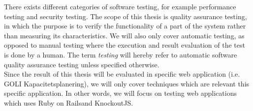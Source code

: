There exists different categories of software testing, for example
performance testing and security testing. The scope of this thesis is
quality assurance testing\footnotemark, in which the purpose is to
verify the functionality of a part of the system rather than measuring
its characteristics. We will also only cover automatic testing, as
opposed to manual testing where the execution and result evaluation of
the test is done by a human. The term \emph{testing} will hereby refer
to automatic software quality assurance testing unless specified
otherwise.\\

Since the result of this thesis will be evaluated in specific web
application (i.e. GOLI Kapacitetsplanering), we will only cover
techniques which are relevant this specific application. In other words,
we will focus on testing web applications which uses Ruby on
Rails\footnotemark and KnockoutJS\footnotemark.\\




